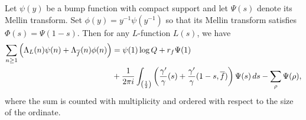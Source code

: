 \documentclass[12pt]{article}
\begin{document}
    \begin{theorem*}
      Let \(\psi(y)\) be a bump function with compact support and let \(\Psi(s)\) denote its Mellin transform. Set \(\phi(y) = y^{-1}\psi(y^{-1})\) so that its Mellin transform satisfies \(\Phi(s) = \Psi(1-s)\). Then for any \(L\)-function \(L(s)\), we have
      \begin{align*}
        \sum_{n \ge 1}\left(\Lambda_{L}(n)\psi(n)+\Lambda_{\overline{f}}(n)\phi(n)\right) &= \psi(1)\log{Q}+r_{f}\Psi(1) \\
        &+ \frac{1}{2\pi i}\int_{\left(\frac{1}{2}\right)}\left(\frac{\gamma'}{\gamma}(s)+\frac{\gamma'}{\gamma}(1-s,\overline{f})\right)\Psi(s)\,ds-\sum_{\rho}\Psi(\rho),
      \end{align*}
      where the sum is counted with multiplicity and ordered with respect to the size of the ordinate.
    \end{theorem*}
\end{document}
